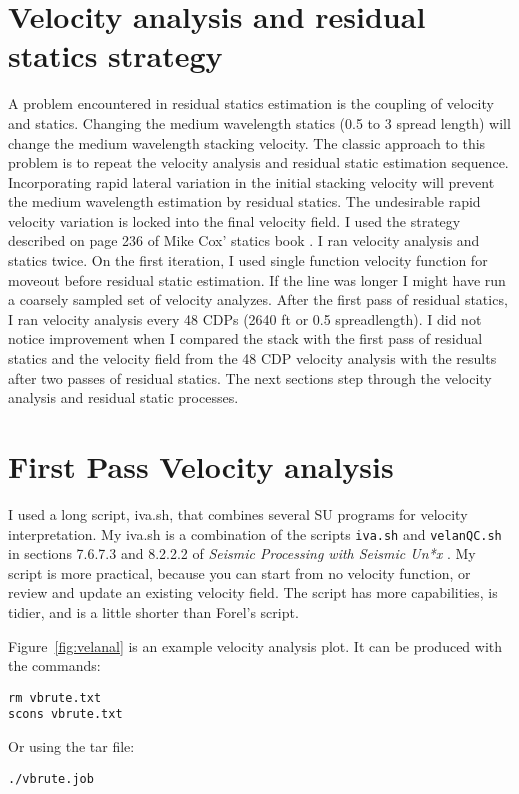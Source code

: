 \section{Velocity analysis and residual statics strategy}
A problem encountered in residual statics estimation is the coupling of 
velocity and statics.  Changing the medium wavelength statics (0.5 to 3 
spread length) will change the medium wavelength stacking velocity.  
The classic approach to this problem is to repeat the velocity analysis 
and residual static estimation sequence.  Incorporating rapid lateral 
variation in the initial stacking velocity will prevent the medium wavelength 
estimation by residual statics.  The undesirable rapid velocity variation 
is locked into the final velocity field.  I used the strategy described on 
page 236 of Mike Cox' statics book \cite[]{SCS00-00-00010531}.  I ran 
velocity analysis and statics twice.  On the first 
iteration, I used single function velocity function for moveout before 
residual static estimation.  If the line was longer I might have run
a coarsely sampled set of velocity analyzes. After the first 
pass of residual statics,  I ran velocity analysis every 48 CDPs (2640 ft 
or 0.5 spreadlength).  I did not notice improvement when I compared the 
stack with the first pass of residual statics and the velocity field from 
the 48 CDP velocity analysis with the results after two passes of residual 
statics.  The next sections step through the velocity analysis and residual 
static processes.

\section{First Pass Velocity analysis}
I used a long script, iva.sh, that combines several SU programs for velocity 
interpretation.  My iva.sh is a combination of the scripts \texttt{iva.sh} and 
\texttt{velanQC.sh} in sections 7.6.7.3 and 8.2.2.2 of 
\emph{Seismic Processing with Seismic Un*x} \cite[]{forel}.  My script is 
more practical, because you can start from no velocity function, or review 
and update an existing velocity field.  The script has more capabilities, 
is tidier, and is a little shorter than Forel's script.

Figure~\ref{fig:velanal} is an example velocity analysis plot.  It can 
be produced with the commands: 
\begin{verbatim}
rm vbrute.txt 
scons vbrute.txt
\end{verbatim}
Or using the tar file:
\begin{verbatim}
./vbrute.job
\end{verbatim}

